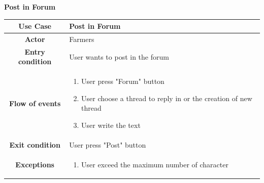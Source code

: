 \documentclass[table, 12pt]{article}
\begin{document}
\begin{itemize}
            
            \begin{table}[H]
                \item[] \textbf{Post in Forum}
                \item[] 
                \centering
                \begin{tabular}{c m{}}
                    \hline
                    \textbf{Use Case} & Post in Forum\\ \hline
                    \textbf{Actor} & Farmers\\ \hline
                    \textbf{Entry condition} & User wants to post in the forum\\  \hline
                    \textbf{Flow of events} & \begin{enumerate}
                                                \item User press "Forum" button
                                                \item User choose a thread to reply in or the creation of new thread
                                                \item User write the text
                                            \end{enumerate}\\ \hline
                    \textbf{Exit condition} & User press "Post" button\\ \hline
                    \textbf{Exceptions} &  \begin{enumerate}
                        \item User exceed the maximum number of character 
                    \end{enumerate}\\ \hline                    
                \end{tabular}
            \end{table}


\end{itemize}
\end{document}

